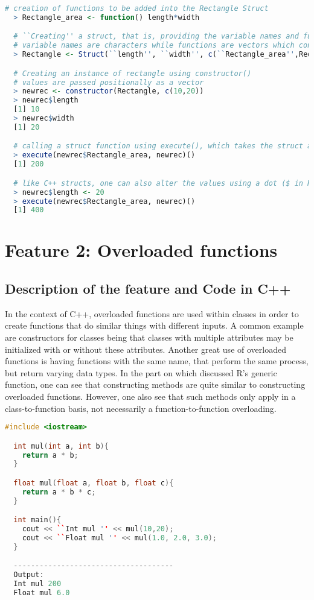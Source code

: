 \documentclass[12pt]{article}
\begin{document}
\begin{lstlisting}[language=R ]
  # creation of functions to be added into the Rectangle Struct
  > Rectangle_area <- function() length*width

  # ``Creating'' a struct, that is, providing the variable names and functions inside the struct
  # variable names are characters while functions are vectors which contain the name and the function
  > Rectangle <- Struct(``length'', ``width'', c(``Rectangle_area'',Rectangle_area))

  # Creating an instance of rectangle using constructor()
  # values are passed positionally as a vector
  > newrec <- constructor(Rectangle, c(10,20))
  > newrec$length
  [1] 10
  > newrec$width
  [1] 20

  # calling a struct function using execute(), which takes the struct and the function as arguments
  > execute(newrec$Rectangle_area, newrec)()
  [1] 200

  # like C++ structs, one can also alter the values using a dot ($ in R)
  > newrec$length <- 20
  > execute(newrec$Rectangle_area, newrec)()
  [1] 400
\end{lstlisting}

\section{Feature 2: Overloaded functions}

\subsection{Description of the feature and Code in C++}
In the context of C++, overloaded functions are used within classes in order to create functions that do similar things with different inputs. A common example are constructors for classes being that classes with multiple attributes may be initialized with or without these attributes. Another great use of overloaded functions is having functions with the same name, that perform the same process, but return varying data types. In the part on which discussed R's generic function, one can see that constructing methods are quite similar to constructing overloaded functions. However, one also see that such methods only apply in a class-to-function basis, not necessarily a function-to-function overloading.

\begin{lstlisting}[language = C++ ]
  #include <iostream>

  int mul(int a, int b){
    return a * b;
  }

  float mul(float a, float b, float c){
    return a * b * c;
  }

  int main(){
    cout << ``Int mul '' << mul(10,20);
    cout << ``Float mul '' << mul(1.0, 2.0, 3.0);
  }

  -------------------------------------
  Output:
  Int mul 200
  Float mul 6.0
\end{lstlisting}
\end{document}
